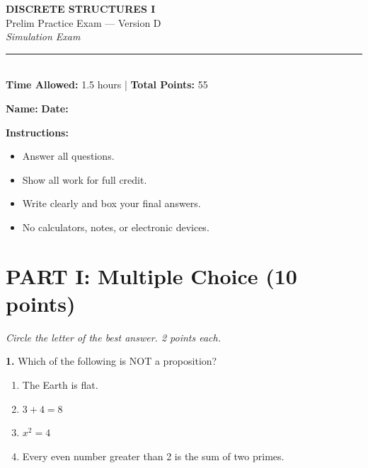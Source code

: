 \documentclass[11pt,a4paper]{article}
\begin{document}
\begin{center}
{\LARGE\textbf{DISCRETE STRUCTURES I}}\\[5pt]
{\Large Prelim Practice Exam --- Version D}\\[5pt]
{\large\textit{Simulation Exam}}\\[10pt]
\rule{0.8\textwidth}{0.5pt}\\[5pt]
\textbf{Time Allowed:} 1.5 hours \quad | \quad \textbf{Total Points:} 55
\end{center}

\vspace{5pt}

\noindent\textbf{Name:} \underline{\hspace{6cm}} \quad \textbf{Date:} \underline{\hspace{3cm}}

\vspace{10pt}

\noindent\textbf{Instructions:}
\begin{itemize}[noitemsep]
    \item Answer all questions.
    \item Show all work for full credit.
    \item Write clearly and box your final answers.
    \item No calculators, notes, or electronic devices.
\end{itemize}

\vspace{15pt}

\section*{PART I: Multiple Choice (10 points)}
\textit{Circle the letter of the best answer. 2 points each.}

\vspace{10pt}

\textbf{1.} Which of the following is NOT a proposition?

\begin{enumerate}[label=(\Alph*),noitemsep]
    \item The Earth is flat.
    \item $3 + 4 = 8$
    \item $x^2 = 4$
    \item Every even number greater than 2 is the sum of two primes.
\end{enumerate}
\end{document}
